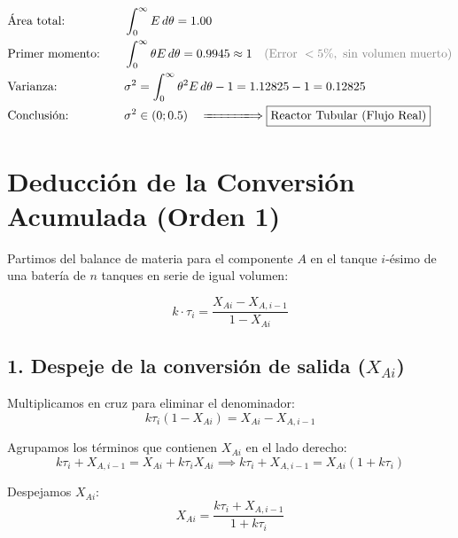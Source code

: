 \begin{alignat*}{2}
     & \text{Área total:}           &  & \int_{0}^{\infty} E \, d\theta = 1.00                                                                   \\
     & \text{Primer momento:} \quad &  & \int_{0}^{\infty} \theta E \, d\theta = 0.9945 \approx 1
    \quad \textcolor{gray}{(\text{Error } < 5\%, \text{ sin volumen muerto})}                                                                    \\
     & \text{Varianza:}             &  & \sigma^2 = \int_{0}^{\infty} \theta^2 E \, d\theta - 1 = 1.12825 - 1 = 0.12825                          \\
     & \text{Conclusión:}           &  & \sigma^2 \in (0; 0.5)\quad \xLongrightarrow{\hspace{1.4cm}} \boxed{\text{Reactor Tubular (Flujo Real)}}
\end{alignat*}
\section*{Deducción de la Conversión Acumulada (Orden 1)}

\noindent Partimos del balance de materia para el componente $A$ en el tanque $i$-ésimo de una batería de $n$ tanques en serie de igual volumen:

\begin{equation}
    k \cdot \tau_i = \frac{X_{Ai} - X_{A,i-1}}{1 - X_{Ai}}
\end{equation}

\subsection*{1. Despeje de la conversión de salida ($X_{Ai}$)}

Multiplicamos en cruz para eliminar el denominador:
\begin{equation}
    k \tau_i (1 - X_{Ai}) = X_{Ai} - X_{A,i-1}
\end{equation}

Agrupamos los términos que contienen $X_{Ai}$ en el lado derecho:
\begin{equation}
    k \tau_i + X_{A,i-1} = X_{Ai} + k \tau_i X_{Ai} \implies k \tau_i + X_{A,i-1} = X_{Ai}(1 + k \tau_i)
\end{equation}

Despejamos $X_{Ai}$:
\begin{equation}
    X_{Ai} = \frac{k \tau_i + X_{A,i-1}}{1 + k \tau_i}
\end{equation}


